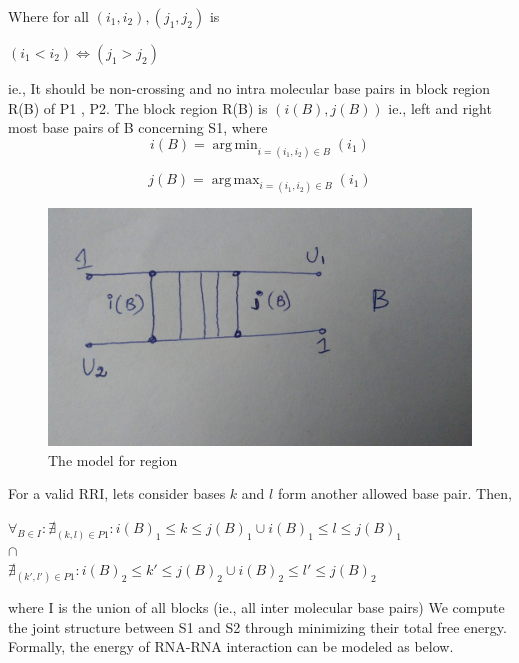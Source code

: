 \documentclass[twoside,a4paper]{report}
\DeclareMathOperator*{\argmin}{arg\,min}
\DeclareMathOperator*{\argmax}{arg\,max}
\begin{document}
 	Where for all $(i_1 ,i_2) ,(j_1, j_2) $ is 
 	
 	\begin{center}
 		$(i_1 < i_2) \iff  (j_1 > j_2)$
 	\end{center}
 	
 	ie., It should be non-crossing and no intra molecular base pairs in block region R(B) of P1 , P2. The block region R(B) is $(i(B) , j(B))$ ie., left and right most base pairs of B concerning S1, where\\
 	
 	\begin{equation*}
 		i(B) = \argmin_{i = (i_1, i_2 ) \in B } (i_1)
 	\end{equation*}
 
 	\begin{equation*}
 			j(B) = \argmax_{i = (i_1, i_2 ) \in B} (i_1)
 	\end{equation*}
 	
 	\begin{figure}[H]
 		\includegraphics[width=0.6\linewidth]{region}
 		\centering
 		\caption{The model for region }
 		\label{fig:region}
 	\end{figure}
 	
 	For a valid RRI, lets consider bases $k$ and $l$ form another allowed base pair. Then,
 	
 	\begin{center}
 		 $\forall_{B\in I } :\nexists_{(k,l) \in P1} : i(B)_1 \le k \le j(B)_1  \cup   i(B)_1 \le l \le j(B)_1 $ \\$\cap $\\ 	$\nexists_{(k',l') \in P1} : i(B)_2 \le k' \le j(B)_2  \cup  i(B)_2 \le l' \le j(B)_2 $
 	\end{center}
 	
 	where I is the union of all blocks (ie., all inter molecular base pairs)
 	We compute the joint structure between S1 and S2 through minimizing their total free energy. Formally, the energy of RNA-RNA interaction \citep{muckstein2006thermodynamics} can be modeled as below.\\
 	
\end{document}
